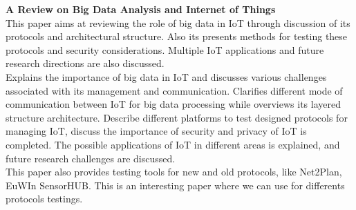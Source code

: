 \textbf{A Review on Big Data Analysis and Internet of Things}\cite{Paper5}\\
This paper aims at reviewing the role of big data in IoT through discussion of its protocols and architectural structure. Also its presents methods for testing these protocols and security considerations. Multiple IoT applications and future research directions are also discussed.\\
Explains the importance of big data in IoT and discusses various challenges associated with its management and communication. Clarifies different mode of communication between IoT for big data processing while overviews its layered structure architecture. Describe different platforms to test designed protocols for managing IoT, discuss the importance of security and privacy of IoT is completed. The possible applications of IoT in different areas is explained, and future research challenges are discussed. \\
This paper also provides testing tools for new and old protocols, like Net2Plan, EuWIn SensorHUB.
This is an interesting paper where we can use for differents protocols testings.

